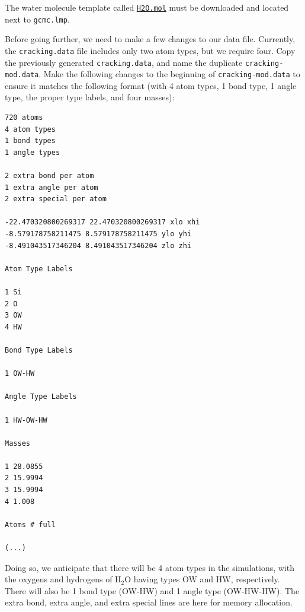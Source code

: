 \documentclass[9pt,tutorial]{livecoms}
\newcommand{\lmpcmd}[1]{\hspace{0pt}\colorbox{listing}{\textcolor{command}{\small{#1}}}\hspace{0pt}} %
\newcommand{\flecmd}[1]{\textcolor{command}{\texttt{#1}}} %
\newcommand{\dwlcmd}[1]{\textcolor{download}{\texttt{#1}}} %
\newcommand{\filepath}{https://raw.githubusercontent.com/lammpstutorials/lammpstutorials-article/main/files/}
\begin{document}
The water molecule template called \href{\filepath tutorial6/H2O.mol}{\dwlcmd{H2O.mol}}
must be downloaded and located next to \flecmd{gcmc.lmp}.

Before going further, we need to make a few changes to our data file.
Currently, the \flecmd{cracking.data} file includes only two atom types, but we require four.
Copy the previously generated \flecmd{cracking.data}, and name the duplicate \flecmd{cracking-mod.data}.
Make the following changes to the beginning of \flecmd{cracking-mod.data}
to ensure it matches the following format (with 4 atom types,
1 bond type, 1 angle type, the proper type labels, and four masses):
\begin{lstlisting}
720 atoms
4 atom types
1 bond types
1 angle types

2 extra bond per atom
1 extra angle per atom
2 extra special per atom

-22.470320800269317 22.470320800269317 xlo xhi
-8.579178758211475 8.579178758211475 ylo yhi
-8.491043517346204 8.491043517346204 zlo zhi

Atom Type Labels

1 Si
2 O
3 OW
4 HW

Bond Type Labels

1 OW-HW

Angle Type Labels

1 HW-OW-HW

Masses

1 28.0855
2 15.9994
3 15.9994
4 1.008

Atoms # full

(...)
\end{lstlisting}
Doing so, we anticipate that there will be 4 atom types in the simulations,
with the oxygens and hydrogens of $\text{H}_2\text{O}$ having
types \lmpcmd{OW} and \lmpcmd{HW}, respectively.  There
will also be 1 bond type (\lmpcmd{OW-HW}) and 1 angle type (\lmpcmd{OW-HW-HW}).
The \lmpcmd{extra bond}, \lmpcmd{extra angle}, and
\lmpcmd{extra special} lines are here for memory allocation.
\end{document}
